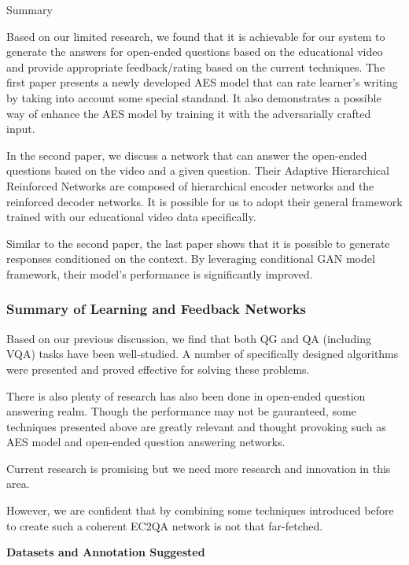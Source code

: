 \documentclass{acm_proc_article-sp}
\renewcommand{\paragraph}[1]{\vskip 6pt\noindent\textbf{#1 }}
\begin{document}
Summary

Based on our limited research, we found that it is achievable for our
system to generate the answers for open-ended questions based on the
educational video and provide appropriate feedback/rating based on the
current techniques. The first paper presents a newly developed AES model
that can rate learner's writing by taking into account some special
standand. It also demonstrates a possible way of enhance the AES model
by training it with the adversarially crafted input.

In the second paper, we discuss a network that can answer the open-ended
questions based on the video and a given question. Their Adaptive
Hierarchical Reinforced Networks are composed of hierarchical encoder
networks and the reinforced decoder networks. It is possible for us to
adopt their general framework trained with our educational video data
specifically.

Similar to the second paper, the last paper shows that it is possible to
generate responses conditioned on the context. By leveraging conditional
GAN model framework, their model's performance is significantly
improved.

\subsubsection{Summary of Learning and Feedback
Networks}\label{summary-of-learning-and-feedback-networks}

Based on our previous discussion, we find that both QG and QA (including
VQA) tasks have been well-studied. A number of specifically designed
algorithms were presented and proved effective for solving these
problems.

There is also plenty of research has also been done in open-ended
question answering realm. Though the performance may not be gauranteed,
some techniques presented above are greatly relevant and thought
provoking such as AES model and open-ended question answering networks.

Current research is promising but we need more research and innovation
in this area.

However, we are confident that by combining some techniques introduced
before to create such a coherent EC2QA network is not that far-fetched.

\paragraph{Datasets and Annotation
Suggested}\label{datasets-and-annotation-suggested}
\end{document}
